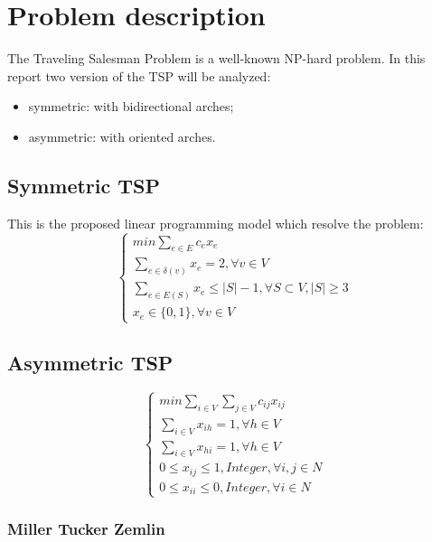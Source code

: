 \chapter{Problem description}
The Traveling Salesman Problem is a well-known NP-hard problem.
In this report two version of the TSP will be analyzed:
\begin{itemize}
	\item symmetric: with bidirectional arches;
  \item asymmetric: with oriented arches.
\end{itemize}

\section{Symmetric TSP}
This is the proposed linear programming model which resolve the problem:
\begin{equation}
\left\{ \begin{array}{l}
		min \sum_{ e\in E } c_ex_e \\
		\sum_{e\in \delta (v) } x_e = 2, \forall v \in V \\
		\sum_{e\in E(S) } x_e \le |S|-1, \forall S \subset V, |S| \ge 3 \\
		x_e \in \{0,1\}, \forall v \in V
	\end{array}
\right.
\end{equation}


\section{Asymmetric TSP}

\begin{equation}
\left\{ \begin{array}{l}
	min \sum_{i\in V}\sum_{j\in V} c_{ij}x_{ij} \\
	\sum_{i\in V} x_{ih} = 1, \forall h \in V \\
	\sum_{i\in V} x_{hi} = 1, \forall h \in V \\
	0 \le x_{ij} \le 1, Integer, \forall i,j \in N \\
	0 \le x_{ii} \le 0, Integer, \forall i \in N
\end{array}
\right.
\label{eq:asym_model}
\end{equation}

\subsection{Miller Tucker Zemlin}

